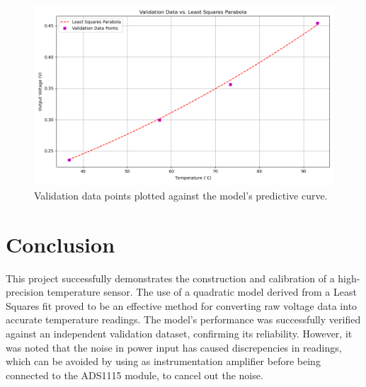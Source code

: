 \documentclass[conference]{IEEEtran}
\begin{document}
\begin{figure}[!h]
    \centering
    \includegraphics[width=0.9\columnwidth]{figs/validation_data.png}
    \caption{Validation data points plotted against the model's predictive curve.}
    \label{fig:validation_plot}
\end{figure}
\newpage

\section{Conclusion}
This project successfully demonstrates the construction and calibration of a high-precision temperature sensor. The use of a quadratic model derived from a Least Squares fit proved to be an effective method for converting raw voltage data into accurate temperature readings. The model's performance was successfully verified against an independent validation dataset, confirming its reliability. However, it was noted that the noise in power input has caused discrepencies in readings, which can be avoided by using as instrumentation amplifier before being connected to the ADS1115 module, to cancel out the noise.
\end{document}
